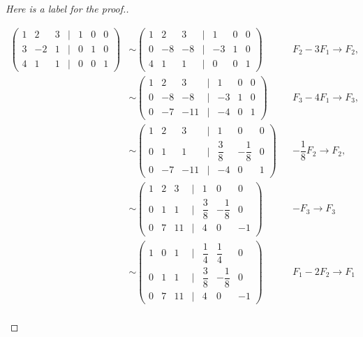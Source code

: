 \documentclass[11pt]{article}
\begin{document}
\begin{proof}[Here is a label for the proof.]
\begin{enumerate}[leftmargin=*,label=\textit{\alph*})]
    \begin{align*}
        \begin{pmatrix}
            1 & 2 & 3 & | & 1 & 0 & 0\\[0.75em]
            3 & -2 & 1 & | & 0 & 1 & 0\\[0.75em]
            4 & 1 & 1 & | & 0 & 0 & 1
        \end{pmatrix}& 
        \sim 
        \begin{pmatrix}
            1 & 2 & 3 & | & 1 & 0 & 0\\[0.75em]
            0 & -8 & -8 & | & -3 & 1 & 0\\[0.75em]
            4 & 1 & 1 & | & 0 & 0 & 1
        \end{pmatrix} && 
        F_2 - 3F_1 \rightarrow F_2,  \\[0.25em]
            &\sim \begin{pmatrix}
            1 & 2 & 3 & | & 1 & 0 & 0\\[0.75em]
            0 & -8 & -8 & | & -3 & 1 & 0\\[0.75em]
            0 & -7 & -11 & | & -4 & 0 & 1
        \end{pmatrix} && F_3 - 4F_1 \rightarrow F_3, \\[0.25em]
            & \sim \begin{pmatrix}
            1 & 2 & 3 & | & 1 & 0 & 0\\[0.75em]
            0 & 1 & 1 & | & \dfrac{3}{8} & -\dfrac{1}{8} & 0\\[0.75em]
            0 & -7 & -11 & | & -4 & 0 & 1
        \end{pmatrix} && -\dfrac{1}{8}F_2 \rightarrow F_2, \\[0.25em]
            & \sim \begin{pmatrix}
            1 & 2 & 3 & | & 1 & 0 & 0\\[0.75em]
            0 & 1 & 1 & | & \dfrac{3}{8} & -\dfrac{1}{8} & 0\\[0.75em]
            0 & 7 & 11 & | & 4 & 0 & -1
        \end{pmatrix} && -F_3 \rightarrow F_3 \\[0.75em]
            & \sim \begin{pmatrix}
            1 & 0 & 1 & | & \dfrac{1}{4} & \dfrac{1}{4} & 0\\[0.75em]
            0 & 1 & 1 & | & \dfrac{3}{8} & -\dfrac{1}{8} & 0\\[0.75em]
            0 & 7 & 11 & | & 4 & 0 & -1
        \end{pmatrix} && F_1 - 2 F_2 \rightarrow F_1 \\[0.75em]

\end{align*}
\end{enumerate}
\end{proof}
\end{document}
